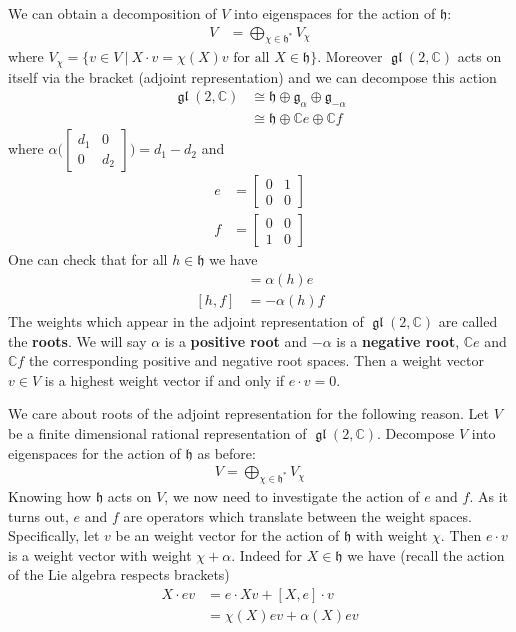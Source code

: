 \documentclass{amsart}
\newcommand{\st}{\ \vert \ }
\newcommand{\C}{\mathbb{C}}
\newcommand{\mf}[1]{\mathfrak{#1}}
\DeclareMathOperator{\gl}{\mf{gl}}
\numberwithin{equation}{section}
\theoremstyle{plain} %
\theoremstyle{definition}
\theoremstyle{remark}
\begin{document}
\hfill

We can obtain a decomposition of $V$ into eigenspaces for the action of $\mf h$: \begin{align*}
	V & = \bigoplus_{\chi\in \mf h^*} V_\chi
\end{align*} where $V_\chi = \{v\in V \st X\cdot v = \chi(X)v \text{ for all $X\in \mf h$}\}$. Moreover
$\gl(2,\C)$ acts on itself via the bracket (adjoint representation) and we can
decompose this action \begin{align*}
	\gl(2,\C) & \cong \mf h \oplus \mf g_{\alpha} \oplus \mf g_{-\alpha} \\
	          & \cong \mf h \oplus \C e \oplus \C f
\end{align*} where $\alpha\bigg(\begin{bmatrix}
			d_1 & 0   \\
			0   & d_2
		\end{bmatrix}\bigg) = d_1 - d_2$ and \begin{align*}
	e & = \begin{bmatrix}
		      0 & 1 \\
		      0 & 0
	      \end{bmatrix} \\
	f & = \begin{bmatrix}
		      0 & 0 \\
		      1 & 0
	      \end{bmatrix}
\end{align*} One can check that for all $h\in \mf h$ we have  \begin{align*}
	[h, e] & = \alpha(h)e \\ [h, f] &= -\alpha(h)f
\end{align*} The weights which appear in the adjoint representation of $\gl(2,\C)$ are called the \textbf{roots}.
We will say $\alpha$ is a \textbf{positive root} and $-\alpha$ is a \textbf{negative root}, $\C e$ and $\C f$ the corresponding positive and negative root spaces.
Then a weight vector $v\in V$ is a highest weight vector if and only if $e\cdot v = 0$.

\hfill

We care about roots of the adjoint representation for the following reason. Let $V$ be a finite dimensional rational representation of $\gl(2,\C)$.
Decompose $V$ into eigenspaces for the action of $\mf h$ as before: \begin{align*}
	V = \bigoplus_{\chi \in \mf h^*} V_\chi
\end{align*} Knowing how $\mf h$ acts on $V$, we now need to investigate the action of $e$ and $f$. As it turns out,
$e$ and $f$ are operators which translate between the weight spaces.
Specifically, let $v$ be an weight vector for the action of $\mf h$ with weight $\chi$.
Then $e\cdot v$ is a weight vector with weight $\chi + \alpha$. Indeed for $X\in \mf h$ we have (recall the action of the Lie algebra respects brackets)
\begin{align*}
	X\cdot ev & = e \cdot Xv + [X,e]\cdot v \\
	          & = \chi(X)ev + \alpha(X)ev
\end{align*}
\end{document}
